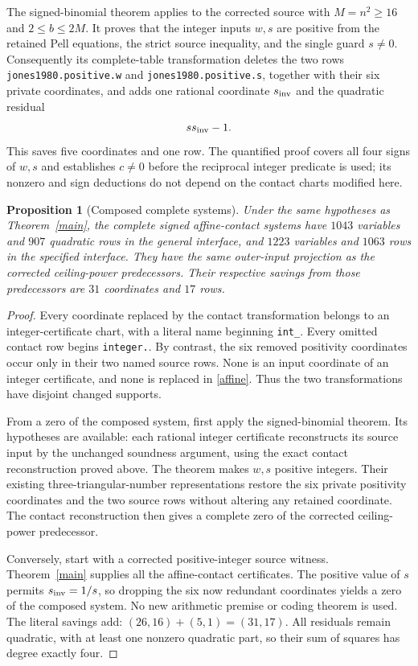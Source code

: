 \documentclass[11pt]{article}
\newtheorem{proposition}[theorem]{Proposition}
\begin{document}
The signed-binomial theorem \cite{signed} applies to the corrected
source with $M=n^2\ge16$ and $2\le b\le2M$. It proves that the
integer inputs $w,s$ are positive from the retained Pell equations,
the strict source inequality, and the single guard $s\ne0$.
Consequently its complete-table transformation deletes the two rows
\texttt{jones1980.positive.w} and
\texttt{jones1980.positive.s}, together with their six private
coordinates, and adds one rational coordinate $s_{\rm inv}$ and
the quadratic residual
\[
                            s s_{\rm inv}-1.
\]
This saves five coordinates and one row. The quantified proof covers
all four signs of $w,s$ and establishes $c\ne0$ before the reciprocal
integer predicate is used; its nonzero and sign deductions do not
depend on the contact charts modified here.

\begin{proposition}[Composed complete systems]
Under the same hypotheses as Theorem~\ref{main}, the complete signed
affine-contact systems have $1043$ variables and $907$ quadratic rows
in the general interface, and $1223$ variables and $1063$ rows in the
specified interface. They have the same outer-input projection as
the corrected ceiling-power predecessors. Their respective savings
from those predecessors are $31$ coordinates and $17$ rows.
\end{proposition}
\begin{proof}
Every coordinate replaced by the contact transformation belongs to an
integer-certificate chart, with a literal name beginning
\texttt{int\_}. Every omitted contact row begins
\texttt{integer.}. By contrast, the six removed positivity coordinates
occur only in their two named source rows. None is an input coordinate
of an integer certificate, and none is replaced in \eqref{affine}.
Thus the two transformations have disjoint changed supports.

From a zero of the composed system, first apply the signed-binomial
theorem. Its hypotheses are available: each rational integer
certificate reconstructs its source input by the unchanged soundness
argument, using the exact contact reconstruction proved above.
The theorem makes $w,s$ positive integers. Their existing
three-triangular-number representations restore the six private
positivity coordinates and the two source rows without altering any
retained coordinate. The contact reconstruction then gives a complete
zero of the corrected ceiling-power predecessor.

Conversely, start with a corrected positive-integer source witness.
Theorem~\ref{main} supplies all the affine-contact certificates.
The positive value of $s$ permits $s_{\rm inv}=1/s$, so dropping
the six now redundant coordinates yields a zero of the composed
system. No new arithmetic premise or coding theorem is used.
The literal savings add: $(26,16)+(5,1)=(31,17)$.
All residuals remain quadratic, with at least one nonzero quadratic
part, so their sum of squares has degree exactly four.
\end{proof}
\end{document}
